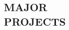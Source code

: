 \documentclass[line,margin]{res}
\begin{document}
\begin{resume}
\section{MAJOR\\ PROJECTS} 




                

\end{resume}
\end{document}
